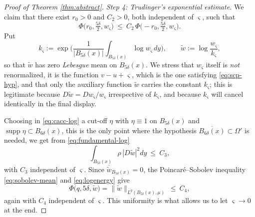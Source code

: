\documentclass[10pt,a4paper]{amsart}
\newcommand{\supp}{\operatorname{supp}}
\begin{document}
\begin{proof}[Proof of Theorem \ref{thm:abstract}]
\emph{Step 4: Trudinger's exponential estimate.} We claim that there exist $r_0>0$ and $C_2>0$,
both independent of $\varsigma$, such that
\begin{equation}\label{eq:trudinger}
\Phi\big(r_0,\tfrac{5\delta}{2},w_\varsigma\big)\ \le\ C_2\,\Phi\big(-r_0,\tfrac{5\delta}{2},w_\varsigma\big).
\end{equation}
Put
\[
k_\varsigma:=\exp\Big(\frac{1}{|B_{5\delta}(x)|}\int_{B_{5\delta}(x)}\log w_\varsigma\,dy\Big),
\qquad \widetilde w:=\log\frac{w_\varsigma}{k_\varsigma},
\]
so that $\widetilde w$ has zero \emph{Lebesgue} mean on $B_{5\delta}(x)$. We stress that
$w_\varsigma$ itself is \emph{not} renormalized, it is the function $v-u+\varsigma$, which is the
one satisfying \eqref{eq:scp-hyp}, and that only the auxiliary function $\widetilde w$ carries the
constant $k_\varsigma$; this is legitimate because
$D\widetilde w=Dw_\varsigma/w_\varsigma$ irrespective of $k_\varsigma$, and because $k_\varsigma$
will cancel identically in the final display.

Choosing in \eqref{eq:cacc-log} a cut-off $\eta$ with $\eta\equiv1$ on $B_{5\delta}(x)$ and
$\supp\eta\subset B_{6\delta}(x)$, this is the only point where the hypothesis
$\overline{B_{6\delta}(x)}\subset\Omega'$ is needed, we get from \eqref{eq:fundamental-log}
\begin{equation}\label{eq:logenergy}
\int_{B_{5\delta}(x)}\rho\,|D\widetilde w|^2dy\ \le\ C_3 ,
\end{equation}
with $C_3$ independent of $\varsigma$. Since $\overline{\widetilde w}_{B_{5\delta}(x)}=0$, the
Poincar\'e--Sobolev inequality \eqref{eq:sobolev-mean} and \eqref{eq:logenergy} give
\begin{equation}\label{eq:logLq}
\Phi\big(q,5\delta,\widetilde w\big)=\|\widetilde w\|_{L^{q}(B_{5\delta}(x),\mu)}\ \le\ C_4 ,
\end{equation}
again with $C_4$ independent of $\varsigma$. This uniformity is what allows us to let
$\varsigma\to0$ at the end.


\end{proof}
\end{document}
